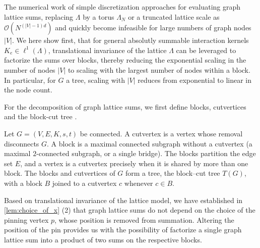 \documentclass[]{amsart}
\numberwithin{mythm}{section}
\begin{document}
The numerical work of simple discretization approaches for evaluating graph lattice sums, replacing $\Lambda$ by a torus $\Lambda_N$ or a truncated lattice scale as $\mathcal O(N^{(|V|-1)d})$ and quickly become infeasible for large numbers of graph nodes $|V|$. We here show first, that for general absolutly summable interaction kernels $K_e\in \ell^1(\Lambda)$, translational invariance of the lattice $\Lambda$ can be leveraged to factorize the sums over blocks, thereby reducing the exponential scaling in the number of nodes $|V|$ to scaling with the largest number of nodes within a block. In particular, for $G$ a tree, scaling with $|V|$ reduces from exponential to linear in the node count. 

For the decomposition of graph lattice sums, we first define blocks, cutvertices and the block-cut tree \cite{diestel2025graph}.

\begin{definition}
Let $G=(V,E,K,s,t)$ be connected. A cutvertex is a vertex whose removal disconnects $G$. A block is a maximal connected subgraph without a cutvertex (a maximal $2$-connected subgraph, or a single bridge). The blocks partition the edge set $E$, and a vertex is a cutvertex precisely when it is shared by more than one block. The blocks and cutvertices of $G$ form a tree, the block--cut tree $T(G)$, with a block $B$ joined to a cutvertex $c$ whenever $c\in B$.
\end{definition}


Based on translational invariance of the lattice model, we have established in \cref{lem:choice_of_x} (2) that graph lattice sums do not depend on the choice of the pinning vertex $p$, whose position is removed from summation. 
Altering the position of the pin provides us with the possibility of factorize a single graph lattice sum into a product of two sums on the respective blocks.
\end{document}
